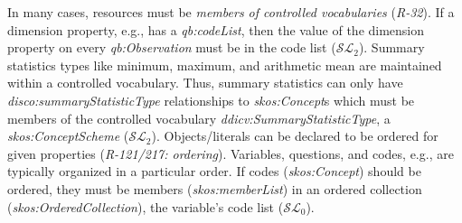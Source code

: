\documentclass{llncs}
\begin{document}
{{%

In many cases, resources must be \emph{members of controlled vocabularies} (\emph{R-32}).
If a dimension property, e.g., has a \emph{qb:codeList},
then the value of the dimension property on every \emph{qb:Observation} must be in the code list ($\mathcal{SL}_{2}$).
Summary statistics types like minimum, maximum, and arithmetic mean are maintained within a controlled vocabulary.  
Thus, summary statistics can only have \emph{disco:summaryStatisticType} relationships to \emph{skos:Concept}s which must be members of the controlled vocabulary \emph{ddicv:SummaryStatisticType}, a \emph{skos:ConceptScheme} ($\mathcal{SL}_{2}$).
Objects/literals can be declared to be ordered for given properties (\emph{R-121/217: ordering}).
Variables, questions, and codes, e.g., are typically organized in a particular order. 
If codes (\emph{skos:Concept}) should be ordered, they must be members (\emph{skos:memberList}) in an ordered collection (\emph{skos:OrderedCollection}), the variable's code list ($\mathcal{SL}_{0}$).

}}
\end{document}
